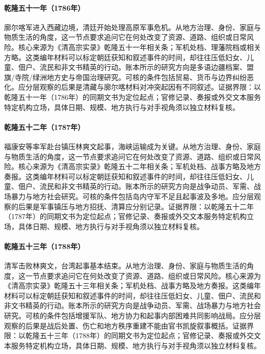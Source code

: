 \hypertarget{social:EQ-1786-FIRST-GURKHA-WAR}{}\paragraph{乾隆五十一年（1786年）}廓尔喀军进入西藏边境，清廷开始处理高原军事危机。从地方治理、身份、家庭与物质生活的角度，这一节点要求追问它在何处改变了资源、道路、组织或日常风险。核心来源为《清高宗实录》乾隆五十一年相关条；军机处档、理藩院档或相关方略。这类编年材料可以标定朝廷获知和叙述事件的时间，却往往压低妇女、儿童、佃户、流民和非文书精英的行动。账本所示的研究方向是多语边疆档案、盟旗/寺院/绿洲地方史与帝国治理研究。可核的条件包括贸易、货币与边界纠纷恶化。应分层观察的后果是清藏与廓尔喀材料对冲突起因有不同叙述。证据界限：以乾隆五十一年（1786年）的同期文书为定位起点；官修记录、奏报或外交文本服务特定机构立场，具体日期、规模、地方执行与对手视角须以独立材料复核。
\hypertarget{social:EQ-1787-TAIWAN-CAMPAIGN}{}\paragraph{乾隆五十二年（1787年）}福康安等率军赴台镇压林爽文起事，海峡运输成为关键。从地方治理、身份、家庭与物质生活的角度，这一节点要求追问它在何处改变了资源、道路、组织或日常风险。核心来源为《清高宗实录》乾隆五十二年相关条；军机处档、战事方略及地方奏报。这类编年材料可以标定朝廷获知和叙述事件的时间，却往往压低妇女、儿童、佃户、流民和非文书精英的行动。账本所示的研究方向是战争动员、军需、战场暴力与地方社会研究。可核的条件包括岛内守军不足且起事波及多地。应分层观察的后果是军事镇压与地方招抚、清算应分别记录。证据界限：以乾隆五十二年（1787年）的同期文书为定位起点；官修记录、奏报或外交文本服务特定机构立场，具体日期、规模、地方执行与对手视角须以独立材料复核。
\hypertarget{social:EQ-1788-LIN-SHUANGWEN-DEFEAT}{}\paragraph{乾隆五十三年（1788年）}清军击败林爽文，台湾起事基本结束。从地方治理、身份、家庭与物质生活的角度，这一节点要求追问它在何处改变了资源、道路、组织或日常风险。核心来源为《清高宗实录》乾隆五十三年相关条；军机处档、战事方略及地方奏报。这类编年材料可以标定朝廷获知和叙述事件的时间，却往往压低妇女、儿童、佃户、流民和非文书精英的行动。账本所示的研究方向是战争动员、军需、战场暴力与地方社会研究。可核的条件包括增援军队、地方协力和起事内部困难共同影响战局。应分层观察的后果是战后处置、伤亡和地方秩序重建不能由官书凯旋叙事概括。证据界限：以乾隆五十三年（1788年）的同期文书为定位起点；官修记录、奏报或外交文本服务特定机构立场，具体日期、规模、地方执行与对手视角须以独立材料复核。
